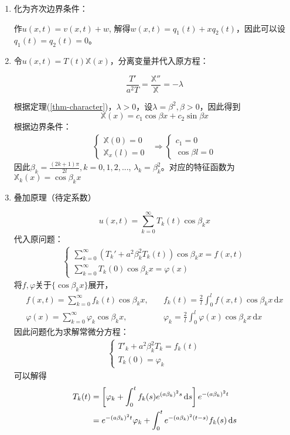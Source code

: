 \documentclass[11pt, a4paper]{article}
\theoremstyle{theorem}
\newcommand{\intd}[1]{\,\mathrm{d}{#1}}
\begin{document}
\begin{enumerate}[Step 1.]
  \item 化为齐次边界条件：

  作$u(x,t) = v(x,t) + w$, 解得$w(x,t) = q_1(t) + xq_2(t)$，因此可以设$q_1(t) = q_2(t) = 0$。

  \item 令$u(x,t)= T(t)\mathbb{X}(x)$，分离变量并代入原方程：

  $$
  \frac{T'}{a^2 T} = \frac{\mathbb{X}''}{\mathbb{X}} = - \lambda
  $$

  根据定理(\ref{thm-character})，$\lambda > 0$，设$\lambda = \beta^2, \beta > 0$，因此得到
  $$
  \mathbb{X}(x) = c_1 \cos \beta x + c_2 \sin \beta x
  $$
  根据边界条件：
  \begin{align*}
      \begin{cases}
      \mathbb{X}(0) = 0 \\
      \mathbb{X}_x(l) = 0
      \end{cases} \; \; \Longrightarrow
      \begin{cases}
        c_1 = 0 \\
        \cos \beta l = 0
      \end{cases}
  \end{align*}
  因此$\beta_k = \frac{(2k+1)\pi}{2l}, k = 0,1,2,...$, $\lambda_k = \beta_k^2$。对应的特征函数为$\mathbb{X}_k(x) = \cos \beta_k x$

  \item 叠加原理（待定系数）

  $$
  u(x,t) = \sum_{k=0}^\infty T_k(t) \cos \beta_k x
  $$
  代入原问题：
  \begin{align}
      \begin{cases}
        \sum_{k=0}^\infty \left(T_k' + a^2 \beta_k^2 T_k(t)\right) \cos \beta_k x = f(x,t) \\
        \sum_{k = 0}^\infty T_k(0) \cos \beta_k x = \varphi(x)
      \end{cases}
  \end{align}
  将$f, \varphi$关于$\{\cos \beta_k x\}$展开，
  \begin{align*}
      f(x,t) = \sum_{k=0}^\infty f_k(t) \cos \beta_k x,& \quad f_k(t) = \frac{2}{l} \int_0^l f(x,t) \cos \beta_k x\intd x \\
      \varphi(x) = \sum_{k=0}^\infty \varphi_k \cos \beta_k x,& \quad \varphi_k = \frac{2}{l} \int_0^l \varphi(x) \cos \beta_k x\intd x
  \end{align*}
  因此问题化为求解常微分方程：
  \begin{align}
      \begin{cases}
        T'_k + a^2 \beta_k^2 T_k = f_k(t) \\
        T_k(0) = \varphi_k
      \end{cases}
  \end{align}
  可以解得
  \begin{align}
      T_k(t) &= \left[\varphi_k + \int_0^t f_k(s)e^{(a \beta_k)^2 s} \intd s \right] e^{-(a\beta_k)^2t} \notag \\
      &= e^{-(a\beta_k)^2t}\varphi_k + \int_0^t e^{- (a \beta_k)^2 (t-s)} f_k(s) \intd s
  \end{align}
\end{enumerate}
\end{document}
